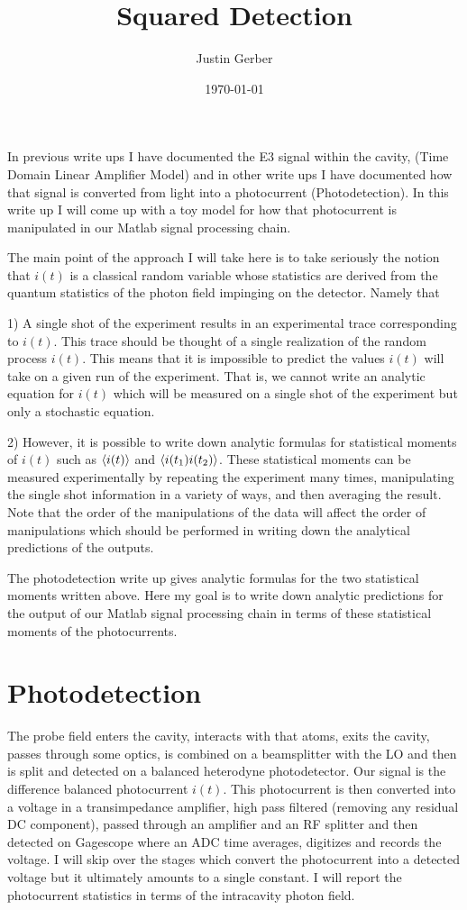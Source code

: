 \documentclass[12pt]{article}
\begin{document}
\title{Squared Detection}
\author{Justin Gerber}
\date{\today}
\maketitle

In previous write ups I have documented the E3 signal within the cavity, (Time Domain Linear Amplifier Model) and in other write ups I have documented how that signal is converted from light into a photocurrent (Photodetection). In this write up I will come up with a toy model for how that photocurrent is manipulated in our Matlab signal processing chain. 


The main point of the approach I will take here is to take seriously the notion that $i(t)$ is a classical random variable whose statistics are derived from the quantum statistics of the photon field impinging on the detector. Namely that 

1) A single shot of the experiment results in an experimental trace corresponding to $i(t)$. This trace should be thought of a single realization of the random process $i(t)$. This means that it is impossible to predict the values $i(t)$ will take on a given run of the experiment. That is, we cannot write an analytic equation for $i(t)$ which will be measured on a single shot of the experiment but only a stochastic equation.

2) However, it is possible to write down analytic formulas for statistical moments of $i(t)$ such as $\braket{i(t)}$ and $\braket{i(t_1)i(t_2)}$. These statistical moments can be measured experimentally by repeating the experiment many times, manipulating the single shot information in a variety of ways, and then averaging the result. Note that the order of the manipulations of the data will affect the order of manipulations which should be performed in writing down the analytical predictions of the outputs.


The photodetection write up gives analytic formulas for the two statistical moments written above. Here my goal is to write down analytic predictions for the output of our Matlab signal processing chain in terms of these statistical moments of the photocurrents.


\section{Photodetection}

The probe field enters the cavity, interacts with that atoms, exits the cavity, passes through some optics, is combined on a beamsplitter with the LO and then is split and detected on a balanced heterodyne photodetector. Our signal is the difference balanced photocurrent $i(t)$. This photocurrent is then converted into a voltage in a transimpedance amplifier, high pass filtered (removing any residual DC component), passed through an amplifier and an RF splitter and then detected on Gagescope where an ADC time averages, digitizes and records the voltage. I will skip over the stages which convert the photocurrent into a detected voltage but it ultimately amounts to a single constant. I will report the photocurrent statistics in terms of the intracavity photon field.
\end{document}
